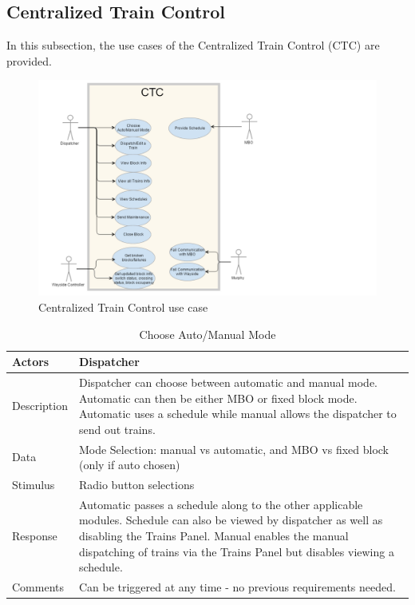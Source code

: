 \documentclass[]{article}
\begin{document}
\subsection{Centralized Train Control}
In this subsection, the use cases of the Centralized Train Control (CTC) are provided.
\begin{figure}[H]
	\centering
	\includegraphics[scale=.5]{ctcusecase.png}
	\caption{Centralized Train Control use case}
\end{figure}

\begin{table}[H]
	\centering
	\caption{Choose Auto/Manual Mode}
	\begin{tabular}{|l|l|}
		\hline
		Actors & \parbox[t]{10cm}{Dispatcher} \\ \hline
		Description & \parbox[t]{10cm}{Dispatcher can choose between automatic and manual mode. Automatic can then be either MBO or fixed block mode. Automatic uses a schedule while manual allows the dispatcher to send out trains.} \\ \hline
		Data &  \parbox[t]{10cm}{Mode Selection: manual vs automatic, and MBO vs fixed block (only if auto chosen)} \\ \hline
		Stimulus &  \parbox[t]{10cm}{Radio button selections} \\ \hline
		Response & \parbox[t]{10cm}{Automatic passes a schedule along to the other applicable modules. Schedule can also be viewed by dispatcher as well as disabling the Trains Panel. Manual enables the manual dispatching of trains via the Trains Panel but disables viewing a schedule.}\\ \hline
		Comments & \parbox[t]{10cm}{Can be triggered at any time - no previous requirements needed. }  \\ \hline
	\end{tabular}
\end{table}
\end{document}
